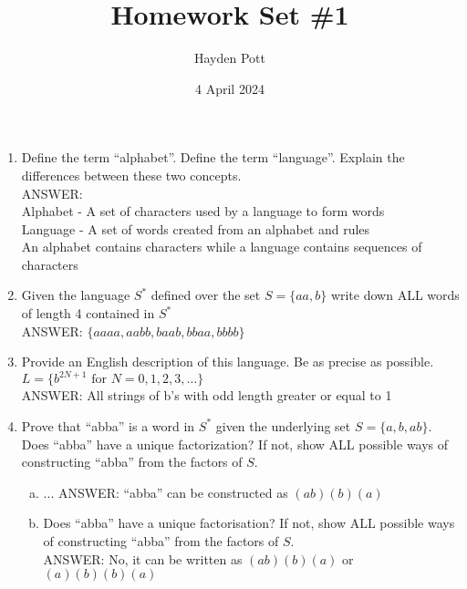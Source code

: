 \documentclass{article}
\begin{document}
\title{Homework Set \#1}
\author{Hayden Pott}
\date{4 April 2024}

\fancyhead{} %
\renewcommand\headrulewidth{0pt}
\fancyfoot{} %
\fancyfoot[C]{\thepage}

\pagestyle{fancy}
\maketitle

\begin{enumerate}[1.]

        \section{Lecture 1}
    \item Define the term ``alphabet''. Define the term ``language''. Explain the
        differences between these two concepts. \\
        ANSWER: \\
        Alphabet - A set of characters used by a language to form words \\
        Language - A set of words created from an alphabet and rules \\
        An alphabet contains characters while a language contains sequences
        of characters
    \item Given the language $S^*$ defined over the set $S = \{aa, b\}$ write
        down ALL words of length 4 contained in $S^*$ \\
        ANSWER: $\{aaaa, aabb, baab, bbaa, bbbb\}$
    \item Provide an English description of this language. Be as precise as
        possible. $L = \{b^{2N+1} \text{ for } N = 0,1,2,3,\dots\}$ \\
        ANSWER: All strings of b's with odd length greater or equal to 1
    \item Prove that ``abba'' is a word in $S^*$ given the underlying set $S =
        \{a, b, ab\}$. Does ``abba'' have a unique factorization? If not, show
        ALL possible ways of constructing ``abba'' from the factors of $S$.
        \begin{enumerate}[a)]
            \item ...
                ANSWER: ``abba'' can be constructed as $(ab)(b)(a)$
            \item Does ``abba'' have a unique factorisation? If not, show ALL
                possible ways of constructing ``abba'' from the factors of $S$.
                \\ 
                ANSWER: No, it can be written as $(ab)(b)(a)$ or $(a)(b)(b)(a)$
        \end{enumerate}


\end{enumerate}
\end{document}
